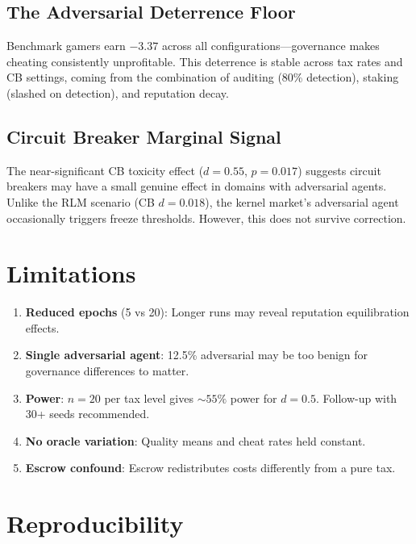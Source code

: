 \documentclass[11pt]{article}
\begin{document}
\subsection{The Adversarial Deterrence Floor}

Benchmark gamers earn $-3.37$ across all configurations---governance makes cheating consistently unprofitable. This deterrence is stable across tax rates and CB settings, coming from the combination of auditing (80\% detection), staking (slashed on detection), and reputation decay.

\subsection{Circuit Breaker Marginal Signal}

The near-significant CB toxicity effect ($d = 0.55$, $p = 0.017$) suggests circuit breakers may have a small genuine effect in domains with adversarial agents. Unlike the RLM scenario (CB $d = 0.018$), the kernel market's adversarial agent occasionally triggers freeze thresholds. However, this does not survive correction.

\section{Limitations}

\begin{enumerate}
    \item \textbf{Reduced epochs} (5 vs 20): Longer runs may reveal reputation equilibration effects.
    \item \textbf{Single adversarial agent}: 12.5\% adversarial may be too benign for governance differences to matter.
    \item \textbf{Power}: $n = 20$ per tax level gives ${\sim}55\%$ power for $d = 0.5$. Follow-up with 30+ seeds recommended.
    \item \textbf{No oracle variation}: Quality means and cheat rates held constant.
    \item \textbf{Escrow confound}: Escrow redistributes costs differently from a pure tax.
\end{enumerate}

\section{Reproducibility}
\end{document}

